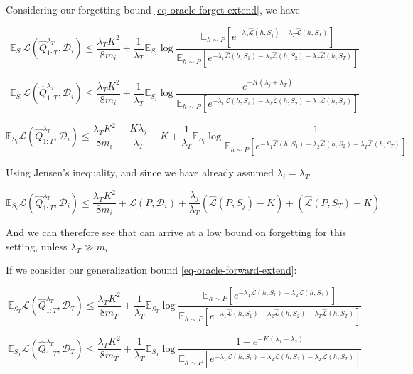 \documentclass[letterpaper]{article}
\theoremstyle{definition}
\begin{document}
Considering our forgetting bound \eqref{eq-oracle-forget-extend}, we have

$$
\mathbb{E}_{S_i}\mathcal{L}(\hat{Q}^{\lambda_T}_{1:T}, \mathcal{D}_i) \leq \frac{\lambda_T K^2}{8m_i}+\frac{1}{\lambda_T}\mathbb{E}_{S_i}\log\frac{\mathbb{E}_{h\sim P}\left [e^{-\lambda_j\hat{\mathcal{L}}(h,S_j)-\lambda_T\hat{\mathcal{L}}(h,S_T)} \right ]}{\mathbb{E}_{h\sim P}\left [e^{-\lambda_1\hat{\mathcal{L}}(h,S_1)-\lambda_2\hat{\mathcal{L}}(h,S_2)-\lambda_T\hat{\mathcal{L}}(h,S_T)} \right ]}
$$

$$
\mathbb{E}_{S_i}\mathcal{L}(\hat{Q}^{\lambda_T}_{1:T}, \mathcal{D}_i) \leq \frac{\lambda_T K^2}{8m_i}+\frac{1}{\lambda_T}\mathbb{E}_{S_i}\log\frac{e^{-K(\lambda_j+\lambda_T)}}{\mathbb{E}_{h\sim P}\left [e^{-\lambda_1\hat{\mathcal{L}}(h,S_1)-\lambda_2\hat{\mathcal{L}}(h,S_2)-\lambda_T\hat{\mathcal{L}}(h,S_T)} \right ]}
$$

$$
\mathbb{E}_{S_i}\mathcal{L}(\hat{Q}^{\lambda_T}_{1:T}, \mathcal{D}_i) \leq \frac{\lambda_T K^2}{8m_i}-\frac{K\lambda_j}{\lambda_T}-K+\frac{1}{\lambda_T}\mathbb{E}_{S_i}\log\frac{1}{\mathbb{E}_{h\sim P}\left [e^{-\lambda_1\hat{\mathcal{L}}(h,S_1)-\lambda_2\hat{\mathcal{L}}(h,S_2)-\lambda_T\hat{\mathcal{L}}(h,S_T)} \right ]}
$$

Using Jensen's inequality, and since we have already assumed $\lambda_i=\lambda_T$

$$
\mathbb{E}_{S_i}\mathcal{L}(\hat{Q}^{\lambda_T}_{1:T}, \mathcal{D}_i) \leq \frac{\lambda_T K^2}{8m_i}+\mathcal{L}(P,\mathcal{D}_i)+\frac{\lambda_j}{\lambda_T}\left (\hat{\mathcal{L}}(P,S_j)-K \right )+\left (\hat{\mathcal{L}}(P,S_T)-K\right )
$$

And we can therefore see that can arrive at a low bound on forgetting for this setting, unless $\lambda_T\gg m_i$

If we consider our generalization bound \eqref{eq-oracle-forward-extend}:

$$
\mathbb{E}_{S_T}\mathcal{L}(\hat{Q}^{\lambda_T}_{1:T}, \mathcal{D}_T) \leq \frac{\lambda_T K^2}{8m_T}+\frac{1}{\lambda_T}\mathbb{E}_{S_T}\log\frac{\mathbb{E}_{h\sim P}\left [e^{-\lambda_1\hat{\mathcal{L}}(h,S_1)-\lambda_2\hat{\mathcal{L}}(h,S_2)} \right ]}{\mathbb{E}_{h\sim P}\left [e^{-\lambda_1\hat{\mathcal{L}}(h,S_1)-\lambda_2\hat{\mathcal{L}}(h,S_2)-\lambda_T\hat{\mathcal{L}}(h,S_T)} \right ]}
$$

$$
\mathbb{E}_{S_T}\mathcal{L}(\hat{Q}^{\lambda_T}_{1:T}, \mathcal{D}_T) \leq \frac{\lambda_T K^2}{8m_T}+\frac{1}{\lambda_T}\mathbb{E}_{S_T}\log\frac{1-e^{-K(\lambda_1+\lambda_2)}}{\mathbb{E}_{h\sim P}\left [e^{-\lambda_1\hat{\mathcal{L}}(h,S_1)-\lambda_2\hat{\mathcal{L}}(h,S_2)-\lambda_T\hat{\mathcal{L}}(h,S_T)} \right ]}
$$
\end{document}
